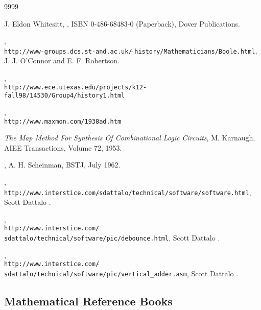 \begin{thecustombibliography}{9999}

J. Eldon Whitesitt,
,
ISBN 0-486-68483-0 (Paperback),
Dover Publications.

, \\
\texttt{http://www-groups.dcs.st-and.ac.uk/$\,\tilde{}\,$history/Mathematicians/Boole.html},
J. J. O'Connor and E. F. Robertson.

, \\
\texttt{http://www.ece.utexas.edu/projects/k12-fall98/14530/Group4/history1.html}

, \\
\texttt{http://www.maxmon.com/1938ad.htm}

{\em The Map Method For Synthesis Of Combinational Logic Circuits},
M. Karnaugh, AIEE Transactions, Volume 72, 1953.

,
A. H. Scheinman, BSTJ, July 1962.

, \\
\texttt{http://www.interstice.com/$\tilde{}$sdattalo/technical/software/software.html},
Scott Dattalo \cite{bibref:i:scottdattalo}.

, \\
\texttt{http://www.interstice.com/$\tilde{}$sdattalo/technical/software/pic/debounce.html},
Scott Dattalo \cite{bibref:i:scottdattalo}.

, \\
\texttt{http://www.interstice.com/$\tilde{}$sdattalo/technical/software/pic/vertical\_adder.asm},
Scott Dattalo \cite{bibref:i:scottdattalo}.

\end{thecustombibliography}


\subsection*{Mathematical Reference Books}

